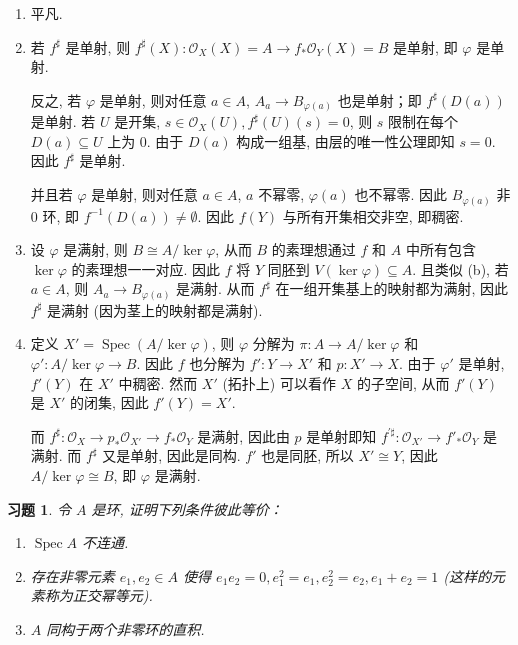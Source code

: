\documentclass{article}
\theoremstyle{exercise}
\newtheorem{exercise}{习题}[section]
\newenvironment{proofc}{\proof}{\endproof}
\def\sO{\mathscr{O}}
\def\Spec{\operatorname{Spec}}
\begin{document}
\begin{proofc}
  \begin{enumerate}[label={(\alph*)}]
    \item 平凡.
    \item 若 $f^\sharp$ 是单射, 则 $f^\sharp(X) \colon \sO_X(X) = A \to f_*\sO_Y(X) = B$
          是单射, 即 $\varphi$ 是单射.

          反之, 若 $\varphi$ 是单射, 则对任意 $a \in A$,
          $A_a \to B_{\varphi(a)}$ 也是单射；即 $f^\sharp(D(a))$ 是单射.
          若 $U$ 是开集, $s \in \sO_X(U), f^\sharp(U)(s) = 0$,
          则 $s$ 限制在每个 $D(a) \subseteq U$ 上为 $0$.
          由于 $D(a)$ 构成一组基, 由层的唯一性公理即知 $s = 0$. 因此 $f^\sharp$ 是单射.

          并且若 $\varphi$ 是单射, 则对任意 $a \in A$, $a$ 不幂零, $\varphi(a)$ 也不幂零.
          因此 $B_{\varphi(a)}$ 非 $0$ 环, 即 $f^{-1}(D(a)) \neq \emptyset$.
          因此 $f(Y)$ 与所有开集相交非空, 即稠密.
    \item 设 $\varphi$ 是满射, 则 $B \cong A / \ker \varphi$,
          从而 $B$ 的素理想通过 $f$ 和 $A$ 中所有包含 $\ker \varphi$ 的素理想一一对应.
          因此 $f$ 将 $Y$ 同胚到 $V(\ker \varphi) \subseteq A$.
          且类似 (b), 若 $a \in A$, 则 $A_a \to B_{\varphi(a)}$ 是满射.
          从而 $f^\sharp$ 在一组开集基上的映射都为满射, 因此 $f^\sharp$ 是满射
          (因为茎上的映射都是满射).
    \item 定义 $X' = \Spec(A / \ker \varphi)$,
          则 $\varphi$ 分解为 $\pi \colon A \to A / \ker \varphi$
          和 $\varphi' \colon A / \ker \varphi \to B$.
          因此 $f$ 也分解为 $f' \colon Y \to X'$ 和 $p \colon X' \to X$.
          由于 $\varphi'$ 是单射, $f'(Y)$ 在 $X'$ 中稠密.
          然而 $X'$ (拓扑上) 可以看作 $X$ 的子空间,
          从而 $f'(Y)$ 是 $X'$ 的闭集, 因此 $f'(Y) = X'$.

          而 $f^\sharp \colon \sO_X \to p_*\sO_{X'} \to f_* \sO_Y$ 是满射,
          因此由 $p$ 是单射即知 $f^{\prime\sharp} \colon \sO_{X'} \to f'_*\sO_Y$ 是满射.
          而 $f^\sharp$ 又是单射, 因此是同构.
          $f'$ 也是同胚, 所以 $X' \cong Y$, 因此 $A / \ker \varphi \cong B$, 即 $\varphi$ 是满射.
          \qedhere
  \end{enumerate}
\end{proofc}

\begin{exercise}
  令 $A$ 是环, 证明下列条件彼此等价：
  \begin{enumerate}[label={\arabic*)}]
    \item $\Spec A$ 不连通.
    \item 存在非零元素 $e_1, e_2 \in A$ 使得 $e_1e_2 = 0, e_1^2 = e_1, e_2^2 = e_2, e_1 + e_2 = 1$
          (这样的元素称为\emph{正交幂等元}).
    \item $A$ 同构于两个非零环的直积.
  \end{enumerate}
\end{exercise}
\end{document}
